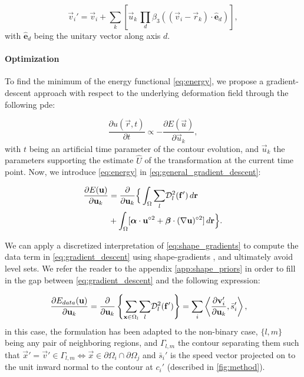   \begin{equation}
    \vec{v}_i' = \vec{v}_i + \sum_k \left[ \vec{u}_k \, \underset{d}{\prod}
      \beta_3( (\vec{v}_i - \vec{r}_k) \cdot \hat{\mathbf{e}}_d ) \right],
  \label{eq:transformation}
  \end{equation}
%
  with $\hat{\mathbf{e}}_d$ being the unitary vector along axis $d$.


\paragraph*{Optimization}
\label{sec:gradient_descent}
To find the minimum of the energy functional \eqref{eq:energy},
  we propose a gradient-descent approach with respect to the underlying
  deformation field through the following \gls*{pde}:

  \begin{equation}
  \frac{\partial u(\vec{r},t)}{\partial t} \propto - \frac{\partial E(\vec{u})}{\partial \vec{u}_k},
  \label{eq:general_gradient_descent}
  \end{equation}
%
  with $t$ being an artificial time parameter of the contour
  evolution, and $\vec{u}_k$ the parameters supporting the estimate
  $\hat{U}$ of the transformation at the current time point.
Now, we introduce \eqref{eq:energy} in \eqref{eq:general_gradient_descent}:

  \begin{align}
  \frac{\partial E(\vec{u})}{\partial \vec{u}_k} &=
  \frac{ \partial }{\partial \vec{u}_k} \Big\{
  \int_{\Omega} \underset{l}{\sum} \mdist{f'}{l} \,d\vec{r} \notag\\
  &+ \int_{\Omega} [ \boldsymbol{\alpha} \cdot \vec{u}^{\circ2}
  + \boldsymbol{\beta} \cdot (\nabla \vec{u})^{\circ2} ] \,d\vec{r}
  \Big\}.
  \label{eq:gradient_descent}
  \end{align}


We can apply a discretized interpretation of \eqref{eq:shape_gradients} to compute
  the data term in \eqref{eq:gradient_descent} using shape-gradients
  \citep{herbulot_segmentation_2006}, and ultimately avoid level sets.
We refer the reader to the appendix \autoref{app:shape_priors} in order to fill in the gap
  between \eqref{eq:gradient_descent} and the following expression:

  \begin{align}
  \frac{\partial E_{data}(\vec{u})}{\partial \vec{u}_k} &=
  \frac{ \partial }{\partial \vec{u}_k} \left\{
   \underset{\vec{x} \in \Omega_l}{\sum} \underset{l}{\sum} \mdist{f'}{l} \right\}
  = \underset{i}{\sum}
   \left\langle \frac{\partial \vec{v}_i'}{\partial \vec{u}_k}, \bar{s}_i'\right\rangle,
  \label{eq:gradient_wshape}
  \end{align}
%
  in this case, the formulation has been adapted to the non-binary case, $\{l,m\}$
    being any pair of neighboring regions, and $\Gamma_{l,m}$ the contour separating
    them such that
    $\vec{x}' = \vec{v}' \in\Gamma_{l,m} \iff \vec{x}\in \partial\Omega_i \cap \partial\Omega_j$
    and $\bar{s}_i'$ is the speed vector projected on to the unit inward normal to the contour
    at $c_i'$ (described in \autoref{fig:method}).


